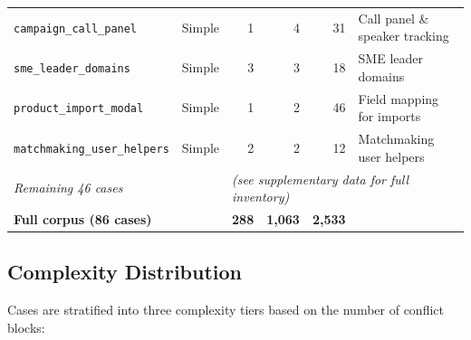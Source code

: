 \documentclass[11pt,a4paper]{article}
\begin{document}
\begin{table}[H]
\begin{tabular}{llrrrl}
\texttt{campaign\_call\_panel}     & Simple   & 1 &  4 & 31  & Call panel \& speaker tracking \\
\texttt{sme\_leader\_domains}      & Simple   & 3 &  3 & 18  & SME leader domains \\
\texttt{product\_import\_modal}    & Simple   & 1 &  2 & 46  & Field mapping for imports \\
\texttt{matchmaking\_user\_helpers}& Simple   & 2 &  2 & 12  & Matchmaking user helpers \\
\midrule
\multicolumn{2}{l}{\emph{Remaining 46 cases}} & \multicolumn{4}{l}{\emph{(see supplementary data for full inventory)}} \\
\midrule
\textbf{Full corpus (86 cases)} &          & \textbf{288} & \textbf{1{,}063} & \textbf{2{,}533} & \\
\bottomrule
\end{tabular}
\end{table}

\subsection{Complexity Distribution}

Cases are stratified into three complexity tiers based on the number of conflict blocks:
\end{document}
